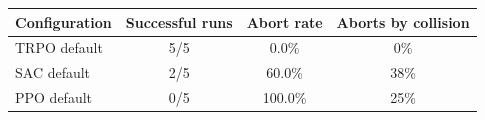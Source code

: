 \begin{tabular}{lccc}
\toprule
Configuration & Successful runs & Abort rate & Aborts by collision \\
\midrule
TRPO default & 5/5 & 0.0\% & 0\% \\
SAC default & 2/5 & 60.0\% & 38\% \\
PPO default & 0/5 & 100.0\% & 25\% \\
\bottomrule
\end{tabular}
